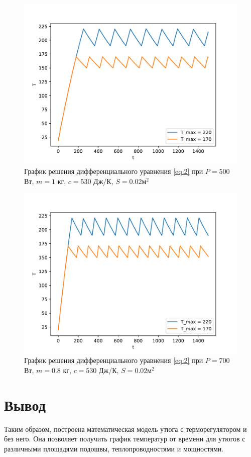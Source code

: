 \documentclass[a4paper, 14pt]{extarticle}
\begin{document}
			\begin{figure}[H]
				\centering
				\includegraphics[width = \linewidth]{fig5.pdf}
				\caption[.] {График решения дифференциального уравнения \eqref{eq:2} 
					при $P = 500$ Вт, $m = 1$ кг, $c = 530$ Дж/К, $S = 0.02 \text{м}^2$}
			\end{figure}
			
			\begin{figure}[H]
				\centering
				\includegraphics[width = \linewidth]{fig6.pdf}
				\caption[.] {График решения дифференциального уравнения \eqref{eq:2} 
					при $P = 700$ Вт, $m = 0.8$ кг, $c = 530$ Дж/К, $S = 0.02 \text{м}^2$}
			\end{figure}
			
	\section{Вывод}
		Таким образом, построена математическая модель утюга с терморегулятором и без него. Она позволяет получить график температур от времени для утюгов с различными площадями подошвы, теплопроводностями и мощностями. 
		
\end{document}
